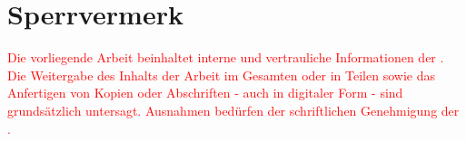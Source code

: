 \section*{Sperrvermerk}
\textcolor{red}{
Die vorliegende Arbeit beinhaltet interne und vertrauliche Informationen der \company.
Die Weitergabe des Inhalts der Arbeit im Gesamten oder in Teilen sowie das Anfertigen
von Kopien oder Abschriften - auch in digitaler Form - sind grundsätzlich untersagt.
Ausnahmen bedürfen der schriftlichen Genehmigung der \company.
}